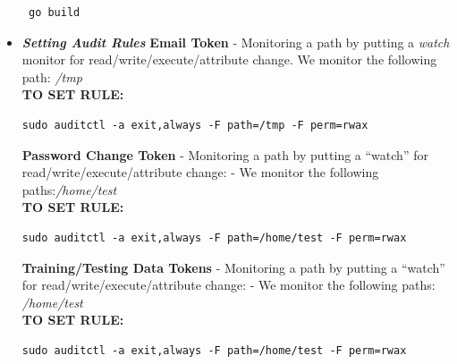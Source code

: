 \documentclass[grad,lot,lof,11pt,oneside,onehalfspace]{RUthesis}
\begin{document}
\begin{itemize}
\begin{lstlisting}
 go build 
		\end{lstlisting}
		\item \textit{\textbf{Setting Audit Rules}}
		\newline
		\textbf{Email Token} 
		\newline
		- Monitoring a path by putting a \textit{watch} monitor for read/write/execute/attribute change. We monitor the following path: \textit{/tmp}
		\\\newline
		\textbf{TO SET RULE:}
		\begin{lstlisting}
sudo auditctl -a exit,always -F path=/tmp -F perm=rwax
		\end{lstlisting}
	   \textbf{Password Change Token}
	    \newline
		- Monitoring a path by putting a “watch” for read/write/execute/attribute change:
		- We monitor the following paths:\textit{/home/test}
		\\\newline
		\textbf{TO SET RULE:}
		\begin{lstlisting}
sudo auditctl -a exit,always -F path=/home/test -F perm=rwax
		\end{lstlisting}
		\textbf{Training/Testing Data Tokens} 
		\newline
		- Monitoring a path by putting a “watch” for read/write/execute/attribute change:
		- We monitor the following paths: \textit{/home/test}
		\\\newline
		\textbf{TO SET RULE:}
		\begin{lstlisting}
sudo auditctl -a exit,always -F path=/home/test -F perm=rwax
		\end{lstlisting}
		

\end{itemize}
\end{document}
